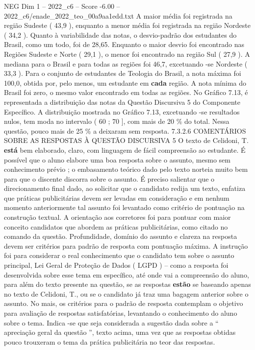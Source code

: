 \begin{textsample}{NEG Dim 1 – 2022\_c6 – Score -6.00 – 2022\_c6/enade\_2022\_teo\_00a9aa1edd.txt}
A maior média foi registrada na região Sudeste ( 43,9 ), enquanto a menor média foi registrada na região Nordeste ( 34,2 ).
Quanto à variabilidade das notas, o desvio-padrão dos estudantes do Brasil, como um todo, foi de 28,65.
Enquanto o maior desvio foi encontrado nas Regiões Sudeste e Norte ( 29,1 ), o menor foi encontrado na região Sul ( 27,9 ).
A mediana para o Brasil e para todas as regiões foi 46,7, excetuando -se Nordeste ( 33,3 ).
Para o conjunto de estudantes de Teologia do Brasil, a nota máxima foi 100,0, obtida por, pelo menos, um estudante em \textbf{cada} região.
A nota mínima do Brasil foi zero, o mesmo valor encontrado em todas as regiões.
No Gráfico 7.13, é representada a distribuição das notas da Questão Discursiva 5 do Componente Específico.
A distribuição mostrada no Gráfico 7.13, excetuando -se resultados nulos, tem moda no intervalo ( 60 ; 70 ], com mais de 20 \% do total.
Nessa questão, pouco mais de 25 \% a deixaram sem resposta. 7.3.2.6 COMENTÁRIOS SOBRE AS RESPOSTAS À QUESTÃO DISCURSIVA 5 O texto de Celidoni, T. \textbf{está} bem elaborado, claro, com linguagem de fácil compreensão ao estudante.
É possível que o aluno elabore uma boa resposta sobre o assunto, mesmo sem conhecimento prévio ; o embasamento teórico dado pelo texto norteia muito bem para que o discente discorra sobre o assunto.
É preciso salientar que o direcionamento final dado, ao solicitar que o candidato redija um texto, enfatiza que práticas publicitárias devem ser levadas em consideração e em nenhum momento anteriormente tal assunto foi levantado como critério de pontuação na construção textual.
A orientação aos corretores foi para pontuar com maior conceito candidatos que abordem as práticas publicitárias, como citado no comando da questão.
Profundidade, domínio do assunto e clareza na resposta devem ser critérios para padrão de resposta com pontuação máxima.
A instrução foi para considerar o real conhecimento que o candidato tem sobre o assunto principal, Lei Geral de Proteção de Dados ( LGPD ) – como a resposta foi desenvolvida sobre esse tema em específico, até onde vai a compreensão do aluno, para além do texto presente na questão, se as respostas \textbf{estão} se baseando apenas no texto de Celidoni, T., ou se o candidato já traz uma bagagem anterior sobre o assunto.
No mais, os critérios para o padrão de resposta contemplam o objetivo para avaliação de respostas satisfatórias, levantando o conhecimento do aluno sobre o tema.
Indica -se que seja considerada a sugestão dada sobre a “ apreciação geral da questão ”, texto acima, uma vez que as respostas obtidas pouco trouxeram o tema da prática publicitária no teor das respostas.

\end{textsample}
